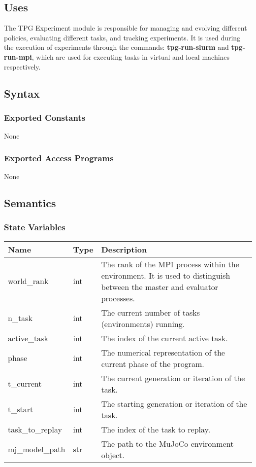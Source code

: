 \documentclass[12pt, titlepage]{article}
\begin{document}
\subsection{Uses}
The TPG Experiment module is responsible for managing and evolving different policies, evaluating different tasks, and tracking experiments. It is used during the execution of experiments through the commands: \textbf{tpg-run-slurm} and \textbf{tpg-run-mpi}, which are used for executing tasks in virtual and local machines respectively.
\subsection{Syntax}

\subsubsection{Exported Constants}
None

\subsubsection{Exported Access Programs}
None

\subsection{Semantics}

\subsubsection{State Variables}
\begin{center}
  \begin{tabular}{p{4cm} p{3cm} p{7cm}}
  \hline
  \textbf{Name} & \textbf{Type} & \textbf{Description} \\
  \hline
  world\_rank & int & The rank of the MPI process within the environment. It is used to distinguish between the master and evaluator processes. \\
  \hline
  n\_task & int & The current number of tasks (environments) running. \\
  \hline
  active\_task & int & The index of the current active task. \\
  \hline
  phase & int & The numerical representation of the current phase of the program. \\
  \hline
  t\_current & int & The current generation or iteration of the task. \\
  \hline
  t\_start & int & The starting generation or iteration of the task. \\
  \hline
  task\_to\_replay & int & The index of the task to replay. \\
  \hline
  mj\_model\_path & str & The path to the MuJoCo environment object. \\
  \hline
  \end{tabular}
\end{center}
\end{document}
